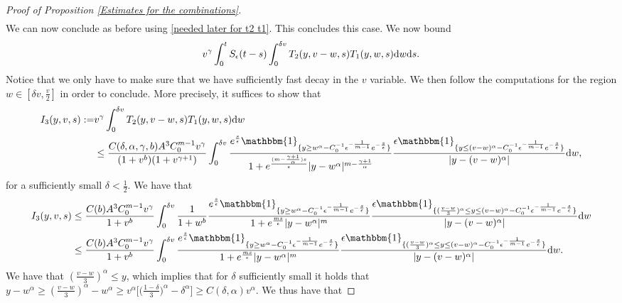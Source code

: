 \documentclass[11pt]{article}
\numberwithin{equation}{section}
\newcommand{\der}{\textup{d}}
\begin{document}
\begin{proof}[Proof of Proposition \ref{Estimates for the combinations}]
\begin{align*}
      \end{align*}
      We can now conclude as before using \eqref{needed later for t2 t1}.
      This concludes this case.
      We now bound \begin{align*}
     v^{\gamma}\int_{0}^{t}S_{\epsilon}(t-s)\int_{0}^{\delta v}  T_{2}(y,v-w,s)T_{1}(y,w,s)\der w\der s.
  \end{align*}
  Notice that we only have to make sure that we have sufficiently fast decay in the $v$ variable. We then follow the computations for the region $w\in[\delta v, \frac{v}{2}]$ in order to conclude. More precisely, it suffices to show that
  \begin{align*}
      I_{3}(y,v,s):=&v^{\gamma}\int_{0}^{\delta v}  T_{2}(y,v-w,s)T_{1}(y,w,s)\der w \\
      &\leq \frac{C(\delta,\alpha,\gamma,b)A^{3}C_{0}^{m-1} v^{\gamma}}{(1+v^{b})(1+v^{\gamma+1})}\int_{0}^{\delta v}\frac{e^{\frac{s}{\epsilon}}\mathbbm{1}_{\{y\geq w^{\alpha}-C_{0}^{-1}\epsilon^{-\frac{1}{m-1}}e^{-\frac{s}{\epsilon}}\}}}{1+e^{\frac{(m-\frac{\gamma+1}{\alpha})s}{\epsilon}}|y-w^{\alpha}|^{m-\frac{\gamma+1}{\alpha}}}\frac{\epsilon\mathbbm{1}_{\{y\leq (v-w)^{\alpha}-C_{0}^{-1}\epsilon^{-\frac{1}{m-1}}e^{-\frac{s}{\epsilon}}\}}}{|y-(v-w)^{\alpha}|}\der w,
  \end{align*}
  for a sufficiently small $\delta<\frac{1}{2}$.
  We have that
  \begin{align*}
         I_{3}(y,v,s)&\leq \frac{C(b)A^{3}C_{0}^{m-1} v^{\gamma}}{1+v^{b}}\int_{0}^{\delta v}\frac{1}{1+w^{b}}\frac{e^{\frac{s}{\epsilon}}\mathbbm{1}_{\{y\geq w^{\alpha}-C_{0}^{-1}\epsilon^{-\frac{1}{m-1}}e^{-\frac{s}{\epsilon}}\}}}{1+e^{\frac{ms}{\epsilon}}|y-w^{\alpha}|^{m}}\frac{\epsilon\mathbbm{1}_{\{(\frac{v-w}{3})^{\alpha}\leq y\leq (v-w)^{\alpha}-C_{0}^{-1}\epsilon^{-\frac{1}{m-1}}e^{-\frac{s}{\epsilon}}\}}}{|y-(v-w)^{\alpha}|}\der w\\
        &\leq \frac{C(b)A^{3}C_{0}^{m-1} v^{\gamma}}{1+v^{b}}\int_{0}^{\delta v}\frac{e^{\frac{s}{\epsilon}}\mathbbm{1}_{\{y\geq w^{\alpha}-C_{0}^{-1}\epsilon^{-\frac{1}{m-1}}e^{-\frac{s}{\epsilon}}\}}}{1+e^{\frac{ms}{\epsilon}}|y-w^{\alpha}|^{m}}\frac{\epsilon\mathbbm{1}_{\{(\frac{v-w}{3})^{\alpha}\leq y\leq (v-w)^{\alpha}-C_{0}^{-1}\epsilon^{-\frac{1}{m-1}}e^{-\frac{s}{\epsilon}}\}}}{|y-(v-w)^{\alpha}|}\der  w.
  \end{align*}
We have that $(\frac{v-w}{3})^{\alpha}\leq y $, which implies that for $\delta$ sufficiently small it holds that $y-w^{\alpha}\geq (\frac{v-w}{3})^{\alpha}-w^{\alpha}\geq v^{\alpha}\bigg[\big(\frac{1-\delta}{3}\big)^{\alpha}-\delta^{\alpha}\bigg]\geq C(\delta,\alpha) v^{\alpha}$. We thus have that

\end{proof}
\end{document}

